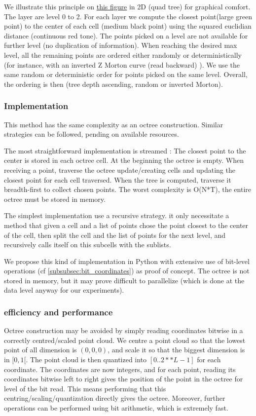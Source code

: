 			 We illustrate this principle on 
			\href{fig:midoc-principle}{this figure} in 2D (quad tree) for graphical comfort. The layer are level 0 to 2. For each layer we compute the closest point(large green point) to the center of each cell (medium black point) using the squared euclidian distance (continuous red tone). The points picked on a level are not available for further level (no duplication of information).
			When reaching the desired max level, all the remaining points are ordered either randomly or deterministically (for instance, with an inverted Z Morton curve (read backward) ).
			We use the same random or deterministic order for points picked on the same level.
			Overall, the ordering is then (tree depth ascending, random or inverted Morton).
			
		\subsubsection{Implementation}
			
			This method has the same complexity as an octree construction. Similar strategies can be followed, pending on available resources.
			
			 
			The most straightforward implementation is streamed :
			The closest point to the center is stored in each octree cell.
			At the beginning the octree is empty. When receiving a point, traverse the octree update/creating cells and updating the closest point for each cell traversed.
			When the tree is computed, traverse it breadth-first to collect chosen points.
			The worst complexity is O(N*T), the entire octree must be stored in memory.
			
			The simplest implementation use a recursive strategy. it only necessitate a method that given a cell and a list of points chose the point closest to the center of the cell, then split the cell and the list of points for the next level, and recursively calls itself on this subcells with the sublists.
			
			We propose this kind of implementation in Python with extensive use of bit-level operations (cf \ref{subsubsec:bit_coordinates}) as proof of concept.
			The octree is not stored in memory, but it may prove difficult to parallelize (which is done at the data level anyway for our experiments). 
			
		\subsubsection{\label{subsubsec:bit_coordinates}efficiency and performance}
			Octree construction may be avoided by simply reading coordinates bitwise in a correctly centred/scaled point cloud.
			We centre a point cloud so that the lowest point of all dimension is $(0,0,0)$, and scale it so that the biggest dimension is in $[0,1[$.
			The point cloud is then quantized into $[0..2**L-1]$ for each coordinate.
			The coordinates are now integers, and for each point, reading its coordinates bitwise left to right gives the position of the point in the octree for level of the bit read.
			This means performing that this centring/scaling/quantization directly gives the octree. Moreover, further operations can be performed using bit arithmetic, which is extremely fast.
			
